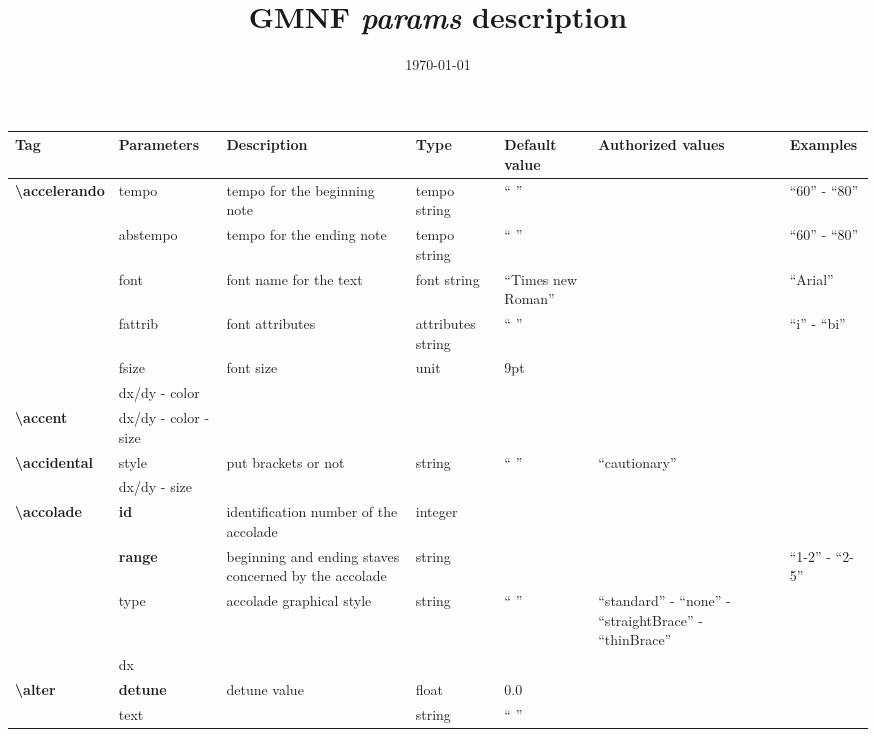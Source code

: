 \documentclass[a4paper, landscape, 10pt]{article}
\makeatletter
\renewcommand{\maketitle}{
    \begin{center}
      \large
      {\LARGE\@title}
      \par\vspace{1ex}
      \@date
    \end{center}
}
\makeatother
\begin{document}
\title{GMNF \emph{params} description}
\date{\today}

\maketitle

\setlength{\parindent}{0pt}

\renewcommand{\tabularxcolumn}[1]{m{#1}}

\begin{tabularx}{\linewidth}{p{3cm}p{3cm}p{6cm}p{2.5cm}p{2.5cm}p{3.5cm}p{3.5cm}}
    \hline
    \textbf{Tag}&\textbf{Parameters}&\textbf{Description}&\textbf{Type}&\textbf{Default value}&\textbf{Authorized values}&\textbf{Examples}\\
    \hline
    \textbf{\textbackslash{}accelerando}&tempo&tempo for the beginning note&tempo string&`` ''&&``60'' - ``80''\\
    &abstempo&tempo for the ending note&tempo string&`` ''&&``60'' - ``80''\\
    &font&font name for the text&font string&``Times new Roman''&&``Arial''\\
    &fattrib&font attributes&attributes string&`` ''&&``i'' - ``bi''\\
    &fsize&font size&unit&9pt&&\\
    &dx/dy - color&&&&&\\
    \hline
    \textbf{\textbackslash{}accent}&dx/dy - color - size&&&&&\\
    \hline
    \textbf{\textbackslash{}accidental}&style&put brackets or not&string&`` ''&``cautionary''&\\
    &dx/dy - size&&&&&\\
    \hline
    \textbf{\textbackslash{}accolade}&\textbf{id}&identification number of the accolade&integer&&&\\
    &\textbf{range}&beginning and ending staves concerned by the accolade&string&&&``1-2'' - ``2-5''\\
    &type&accolade graphical style&string&`` ''&``standard'' - ``none'' - ``straightBrace'' - ``thinBrace''&\\
    &dx&&&&&\\
    \hline
    \textbf{\textbackslash{}alter}&\textbf{detune}&detune value&float&0.0&&\\
    &text&&string&`` ''&&\\ %
    \hline

\end{tabularx}
\end{document}
